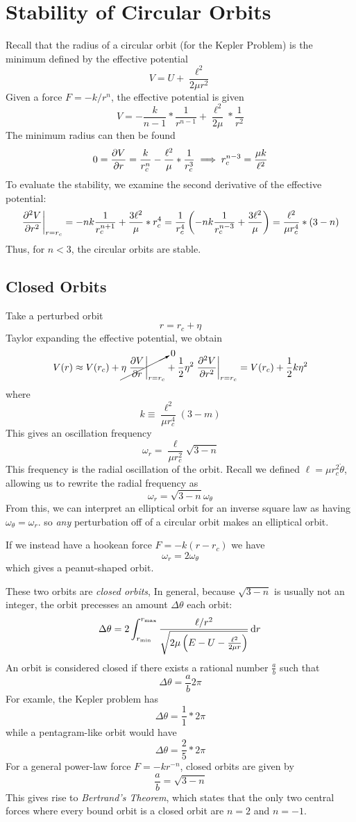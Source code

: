 \section{Stability of Circular Orbits}
Recall that the radius of a circular orbit (for the Kepler Problem) is the minimum defined by the effective potential
\[V = U+\frac{\ell^2}{2\mu r^2}\]
Given a force \(F = -k/r^n\), the effective potential is given
\[V = -\frac{k}{n-1}*\frac{1}{r^{n-1}}+\frac{\ell^2}{2\mu}*\frac{1}{r^2}\]
The minimum radius can then be found
\[0=\frac{\partial V}{\partial r}=\frac{k}{r_c^n}-\frac{\ell^2}{\mu}*\frac{1}{r_c^3}\implies r_c^{n-3} = \frac{\mu k}{\ell^2}\]
To evaluate the stability, we examine the second derivative of the effective potential:
\[\left.\frac{\partial ^2V}{\partial r^2}\right|_{r=r_c}=-nk\frac{1}{r_c^{n+1}}+\frac{3\ell^2}{\mu}*r_c^4 = \frac{1}{r_c^4}\left(-nk\frac{1}{r_c^{n-3}}+\frac{3\ell^2}{\mu}\right)=\frac{\ell^2}{\mu r_c^4}*(3-n)\]
Thus, for \(n<3\), the circular orbits are stable.

\subsection{Closed Orbits}
Take a perturbed orbit
\[r = r_c+\eta\]
Taylor expanding the effective potential, we obtain
\[V(r)\approx V(r_c)+\cancelto{0}{\eta\left.\frac{\partial V}{\partial r}\right|_{r=r_c}}+\frac{1}{2}\eta^2\left.\frac{\partial ^2V}{\partial r^2}\right|_{r=r_c}=V(r_c)+\frac{1}{2}k\eta^2\]
where
\[k\equiv \frac{\ell^2}{\mu r_c^4}(3-m)\]
This gives an oscillation frequency
\[\omega_r = \frac{\ell}{\mu r_c^2}\sqrt{3-n}\]
This frequency is the radial oscillation of the orbit. 
Recall we defined \(\ell = \mu r_c^2 \dot\theta\), allowing us to rewrite the radial frequency as
\[\omega_r = \sqrt{3-n}\omega_\theta\]
From this, we can interpret an elliptical orbit for an inverse square law as having \(\omega_\theta=\omega_r\).
so \emph{any} perturbation off of a circular orbit makes an elliptical orbit.

If we instead have a hookean force \(F = -k(r-r_c)\) we have
\[\omega_r = 2\omega_\theta\]
which gives a peanut-shaped orbit.

These two orbits are \emph{closed orbits}, In general, because \(\sqrt{3-n}\) is usually not an integer, the orbit precesses an amount \(\Delta\theta\) each orbit:
\begin{equation}
	\Delta\theta = 2\int_{r_{\min}}^{r_{\max}}\frac{\ell/r^2}{\sqrt{2\mu\left(E-U-\frac{\ell^2}{2\mu r}\right)}}\d{r}
\end{equation}
An orbit is considered closed if there exists a rational number \(\frac{a}{b}\) such that
\[\Delta \theta = \frac{a}{b}2\pi\]
For examle, the Kepler problem has
\[\Delta\theta = \frac{1}{1}*2\pi\]
while a pentagram-like orbit would have
\[\Delta\theta = \frac{2}{5}*2\pi\]
For a general power-law force \(F=-kr^{-n}\), closed orbits are given by
\begin{equation}
	\frac{a}{b}=\sqrt{3-n}
\end{equation}
This gives rise to \emph{Bertrand's Theorem}, which states that the only two central forces where every bound orbit is a closed orbit are \(n=2\) and \(n=-1\).

